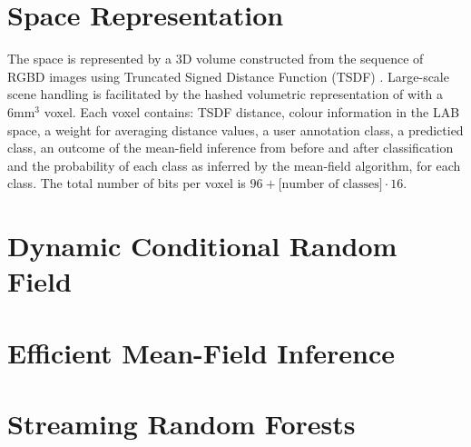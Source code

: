 \documentclass{llncs}
\begin{document}
%     
%     
%     
%     
%     
   


\section{Space Representation}
   
  The space is represented by a 3D volume constructed from the sequence of RGBD images using Truncated Signed Distance Function (TSDF) \cite{TSDF}. Large-scale scene handling is facilitated by the hashed volumetric representation of \cite{hashed_voxel} with a 6mm$^{3}$ voxel. Each voxel contains: TSDF distance, colour information in the LAB space, a weight for averaging distance values, a user annotation class, a predictied class, an outcome of the mean-field inference from before and after classification and the probability of each class as inferred by the mean-field algorithm, for each class. The total number of bits per voxel is $96 + \textrm{[number of classes]} \cdot 16$.
  
\section{Dynamic Conditional Random Field}
\section{Efficient Mean-Field Inference}
\section{Streaming Random Forests}
  
\end{document}
